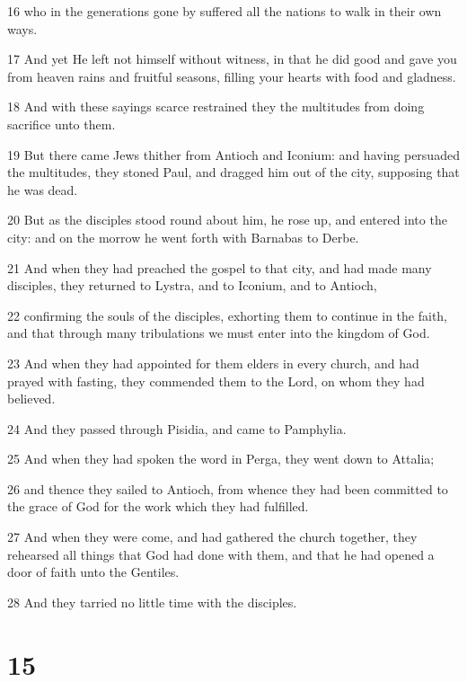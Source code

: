 \par 16 who in the generations gone by suffered all the nations to walk in their own ways.
\par 17 And yet He left not himself without witness, in that he did good and gave you from heaven rains and fruitful seasons, filling your hearts with food and gladness.
\par 18 And with these sayings scarce restrained they the multitudes from doing sacrifice unto them.
\par 19 But there came Jews thither from Antioch and Iconium: and having persuaded the multitudes, they stoned Paul, and dragged him out of the city, supposing that he was dead.
\par 20 But as the disciples stood round about him, he rose up, and entered into the city: and on the morrow he went forth with Barnabas to Derbe.
\par 21 And when they had preached the gospel to that city, and had made many disciples, they returned to Lystra, and to Iconium, and to Antioch,
\par 22 confirming the souls of the disciples, exhorting them to continue in the faith, and that through many tribulations we must enter into the kingdom of God.
\par 23 And when they had appointed for them elders in every church, and had prayed with fasting, they commended them to the Lord, on whom they had believed.
\par 24 And they passed through Pisidia, and came to Pamphylia.
\par 25 And when they had spoken the word in Perga, they went down to Attalia;
\par 26 and thence they sailed to Antioch, from whence they had been committed to the grace of God for the work which they had fulfilled.
\par 27 And when they were come, and had gathered the church together, they rehearsed all things that God had done with them, and that he had opened a door of faith unto the Gentiles.
\par 28 And they tarried no little time with the disciples.

\chapter{15}

